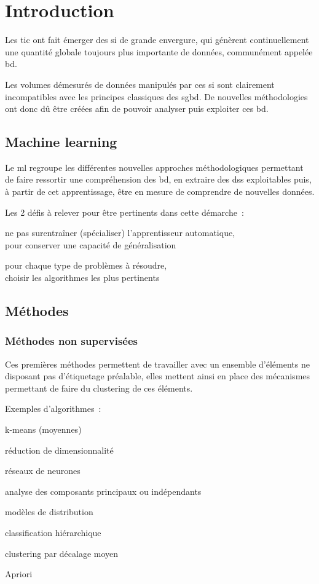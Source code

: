 \section{Introduction}

Les \gls{tic} ont fait émerger des \gls{si} de grande envergure, qui génèrent
continuellement une quantité globale toujours plus importante de données,
communément appelée \gls{bd}.

Les volumes démesurés de données manipulés par ces \gls{si} sont clairement
incompatibles avec les principes classiques des \gls{sgbd}.
De nouvelles méthodologies ont donc dû être créées afin de pouvoir
analyser puis exploiter ces \gls{bd}.

\subsection{Machine learning}

Le \gls{ml} regroupe les différentes nouvelles approches méthodologiques
permettant de faire ressortir une compréhension des \gls{bd}, en extraire
des \glspl{ds} exploitables puis, à partir de cet apprentissage,
être en mesure de comprendre de nouvelles données.

Les 2 défis à relever pour être pertinents dans cette démarche :
\begin{itmz}
\item{ne pas surentraîner (spécialiser) l’apprentisseur automatique,\\
pour conserver une capacité de généralisation}
\item{pour chaque type de problèmes à résoudre,\\
choisir les algorithmes les plus pertinents}
\end{itmz}

\subsection{Méthodes}

\subsubsection{Méthodes non supervisées}

Ces premières méthodes permettent de travailler avec un ensemble d’éléments
ne disposant pas d’étiquetage préalable, elles mettent ainsi en place
des mécanismes permettant de faire du \gls{clustering} de ces éléments.

Exemples d’algorithmes :
\begin{itmz}
\item{k-means (moyennes)}
\item{réduction de dimensionnalité}
\item{réseaux de neurones}
\item{analyse des composants principaux ou indépendants}
\item{modèles de distribution}
\item{classification hiérarchique}
\item{\gls{clustering} par décalage moyen}
\item{Apriori}
\end{itmz}

